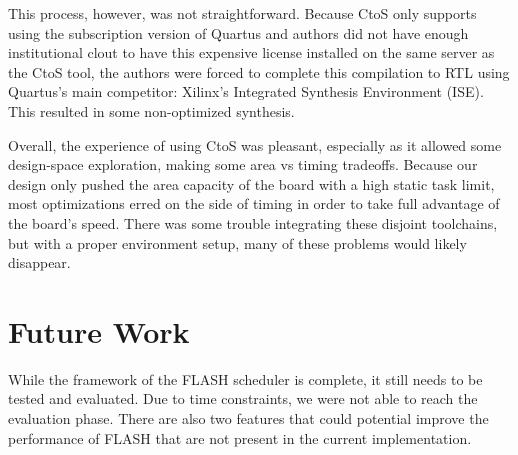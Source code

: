 \documentclass{sig-alternate-10pt}
\begin{document}
This process, however, was not straightforward.  Because CtoS only supports
using the subscription version of Quartus and authors did not have enough
institutional clout to have this expensive license installed on the same
server as the CtoS tool, the authors were forced to complete this
compilation to RTL using Quartus's main competitor: Xilinx's Integrated
Synthesis Environment (ISE).  This resulted in some non-optimized synthesis.

Overall, the experience of using CtoS was pleasant, especially as it allowed
some design-space exploration, making some area vs timing tradeoffs.
Because our design only pushed the area capacity of the board with a high
static task limit, most optimizations erred on the side of timing in order
to take full advantage of the board's speed.  There was some trouble
integrating these disjoint toolchains, but with a proper environment setup,
many of these problems would likely disappear.


\section{Future Work}
\label{sec:future}
While the framework of the FLASH scheduler is complete, it still needs to be tested and evaluated. Due to time constraints, we were not able to reach the evaluation phase. There are also two features that could potential improve the performance of FLASH that are not present in the current implementation.
\end{document}
